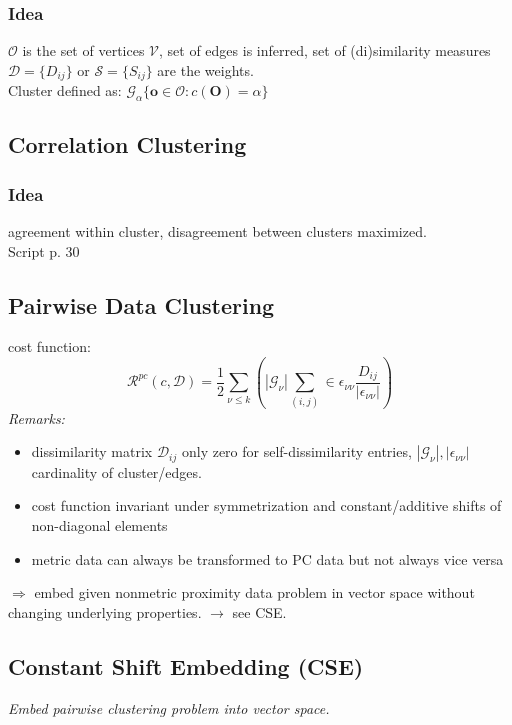 \documentclass[9pt,parskip]{scrartcl}
\begin{document}
\begin{multicols*}{4}
\subsubsection*{Idea}
$\mathcal{O}$ is the set of vertices $\mathcal{V}$, set of edges is inferred, set of (di)similarity measures $\mathcal{D}=\{D_{ij}\}$ or $\mathcal{S}=\{S_{ij}\}$ are the weights. \\
Cluster defined as: $\mathcal{G}_{\alpha} \{ \mathbf{o} \in \mathcal{O} : c( \mathbf{O}) = \alpha\}$
\subsection*{Correlation Clustering}
\subsubsection*{Idea}
agreement within cluster, disagreement between clusters maximized. \\
Script p. 30
\subsection*{Pairwise Data Clustering}
cost function: 
\[\mathcal{R}^{pc}(c, \mathcal{D}) = \frac 1 2 \sum_{\nu \leq k} \left( |\mathcal{G}_{\nu}| \sum_{(i,j)} \in \epsilon_{\nu \nu} \frac{D_{ij}}{|\epsilon_{\nu \nu}|} \right) \]
\textit{Remarks:} 
\begin{itemize}
	\item dissimilarity matrix $\mathcal{D}_{ij}$ only zero for self-dissimilarity entries, $|\mathcal{G}_{\nu}|, |\epsilon_{\nu \nu}|$ cardinality of cluster/edges. 
	\item cost function invariant under symmetrization and constant/additive shifts of non-diagonal elements
	\item metric data can always be transformed to PC data but not always vice versa
\end{itemize}
$ \Rightarrow $ embed given nonmetric proximity data problem in vector space without changing underlying properties. $\rightarrow$ see CSE.
\subsection*{Constant Shift Embedding (CSE)}
\textit{Embed pairwise clustering problem into vector space.}

\end{multicols*}
\end{document}
